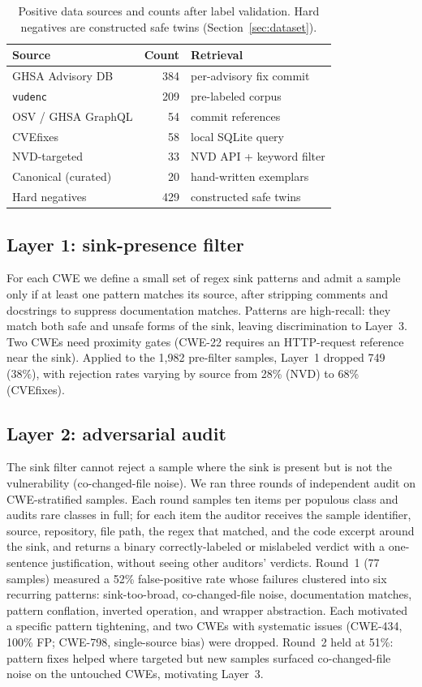 \documentclass[conference]{IEEEtran}
\begin{document}
\begin{table}[t]
\caption{Positive data sources and counts after label validation. Hard
negatives are constructed safe twins (Section~\ref{sec:dataset}).}
\label{tab:sources}
\centering
\begin{tabular}{lr l}
\toprule
\textbf{Source} & \textbf{Count} & \textbf{Retrieval} \\
\midrule
GHSA Advisory DB    & 384 & per-advisory fix commit \\
\texttt{vudenc}     & 209 & pre-labeled corpus \\
OSV / GHSA GraphQL  &  54 & commit references \\
CVEfixes            &  58 & local SQLite query \\
NVD-targeted        &  33 & NVD API + keyword filter \\
Canonical (curated) &  20 & hand-written exemplars \\
\midrule
Hard negatives      & 429 & constructed safe twins \\
\bottomrule
\end{tabular}
\end{table}

\subsection{Layer 1: sink-presence filter}
For each CWE we define a small set of regex sink patterns and admit a
sample only if at least one pattern matches its source, after stripping
comments and docstrings to suppress documentation matches. Patterns are
high-recall: they match both safe and unsafe forms of the sink, leaving
discrimination to Layer~3. Two CWEs need proximity gates (CWE-22
requires an HTTP-request reference near the sink). Applied to the 1{,}982
pre-filter samples, Layer~1 dropped 749 (38\%), with rejection rates
varying by source from 28\% (NVD) to 68\% (CVEfixes).

\subsection{Layer 2: adversarial audit}
The sink filter cannot reject a sample where the sink is present but is
not the vulnerability (co-changed-file noise). We ran three rounds of
independent audit on CWE-stratified samples. Each round samples ten
items per populous class and audits rare classes in full; for each item
the auditor receives the sample identifier, source, repository, file
path, the regex that matched, and the code excerpt around the sink, and
returns a binary correctly-labeled or mislabeled verdict with a
one-sentence justification, without seeing other auditors' verdicts.
Round~1 (77 samples)
measured a 52\% false-positive rate whose failures clustered into six
recurring patterns: sink-too-broad, co-changed-file noise,
documentation matches, pattern conflation, inverted operation, and
wrapper abstraction. Each motivated a specific pattern tightening, and
two CWEs with systematic issues (CWE-434, 100\% FP; CWE-798,
single-source bias) were dropped. Round~2 held at 51\%: pattern fixes
helped where targeted but new samples surfaced co-changed-file noise on
the untouched CWEs, motivating Layer~3.
\end{document}
